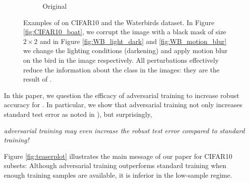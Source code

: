 \begin{figure}[t]
\begin{center}
\begin{subfigure}[b]{0.2\textwidth}
  \caption{Original}
  \label{fig:fig:WB_original}
\end{subfigure}
\caption{Examples of \nameofattacks on CIFAR10 and the
  Waterbirds dataset. In Figure \ref{fig:CIFAR10_boat}, we corrupt the image with a black mask of size $2 \times 2$ and in Figure \ref{fig:WB_light_dark} and \ref{fig:WB_motion_blur} we change the lighting conditions (darkening) and apply motion blur on the bird in the image respectively. 
  All perturbations effectively reduce the information about the class in the images: they are the result of \nameofattacks.}
\label{fig:sig_att_examples}
\end{center}
\vskip -0.2in
\end{figure}


In this paper, we question the efficacy of adversarial training to increase
robust accuracy for \nameofattacks.
In particular, we show that adversarial training not only increases standard test error as noted in \cite{zhang19, tsipras19, Stutz19, raghunathan20}), but surprisingly,
\begin{center}
 \emph{adversarial training may even increase the robust test error compared to standard training!}
\end{center}
Figure \ref{fig:teaserplot} illustrates the main message of our paper for CIFAR10 subsets: Although adversarial training
outperforms standard training when enough training samples are available, it is inferior %
in the low-sample regime.  
